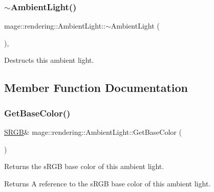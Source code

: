 \subsubsection{\texorpdfstring{$\sim$\+Ambient\+Light()}{~AmbientLight()}}
{\footnotesize\ttfamily mage\+::rendering\+::\+Ambient\+Light\+::$\sim$\+Ambient\+Light (\begin{DoxyParamCaption}{ }\end{DoxyParamCaption})\hspace{0.3cm}{\ttfamily [virtual]}, {\ttfamily [default]}}

Destructs this ambient light. 

\subsection{Member Function Documentation}
\hypertarget{classmage_1_1rendering_1_1_ambient_light_a0b45abc0f1cf9e9fae345c8574238432}{}\label{classmage_1_1rendering_1_1_ambient_light_a0b45abc0f1cf9e9fae345c8574238432} 
\subsubsection{\texorpdfstring{Get\+Base\+Color()}{GetBaseColor()}\hspace{0.1cm}{\footnotesize\ttfamily [1/2]}}
{\footnotesize\ttfamily \hyperlink{structmage_1_1_s_r_g_b}{S\+R\+GB}\& mage\+::rendering\+::\+Ambient\+Light\+::\+Get\+Base\+Color (\begin{DoxyParamCaption}{ }\end{DoxyParamCaption})\hspace{0.3cm}{\ttfamily [noexcept]}}

Returns the s\+R\+GB base color of this ambient light.

\begin{DoxyReturn}{Returns}
A reference to the s\+R\+GB base color of this ambient light. 
\end{DoxyReturn}
\hypertarget{classmage_1_1rendering_1_1_ambient_light_a9396951fe2029233ce1f6b4ff38dcc8b}{}\label{classmage_1_1rendering_1_1_ambient_light_a9396951fe2029233ce1f6b4ff38dcc8b} 

